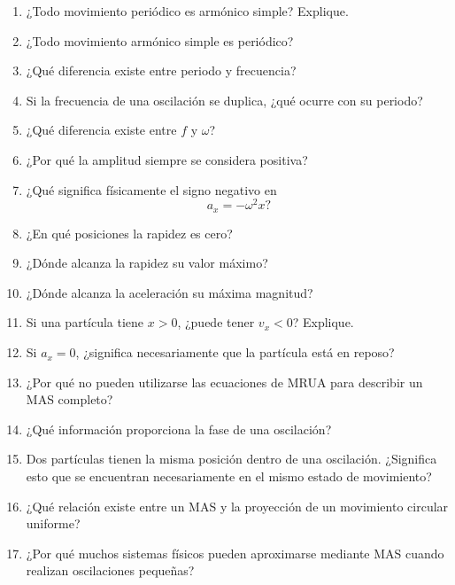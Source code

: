 \begin{enumerate}
    \item ¿Todo movimiento periódico es armónico simple? Explique.

    \item ¿Todo movimiento armónico simple es periódico?

    \item ¿Qué diferencia existe entre periodo y frecuencia?

    \item Si la frecuencia de una oscilación se duplica, ¿qué ocurre con su periodo?

    \item ¿Qué diferencia existe entre \(f\) y \(\omega\)?

    \item ¿Por qué la amplitud siempre se considera positiva?

    \item ¿Qué significa físicamente el signo negativo en
    \[ a_x=-\omega^2x? \]

    \item ¿En qué posiciones la rapidez es cero?

    \item ¿Dónde alcanza la rapidez su valor máximo?

    \item ¿Dónde alcanza la aceleración su máxima magnitud?

    \item Si una partícula tiene \(x>0\), ¿puede tener \(v_x<0\)? Explique.

    \item Si \(a_x=0\), ¿significa necesariamente que la partícula está en reposo?

    \item ¿Por qué no pueden utilizarse las ecuaciones de MRUA para describir un MAS completo?

    \item ¿Qué información proporciona la fase de una oscilación?

    \item Dos partículas tienen la misma posición dentro de una oscilación. ¿Significa esto que se encuentran necesariamente en el mismo estado de movimiento?

    \item ¿Qué relación existe entre un MAS y la proyección de un movimiento circular uniforme?

    \item ¿Por qué muchos sistemas físicos pueden aproximarse mediante MAS cuando realizan oscilaciones pequeñas?
\end{enumerate}

